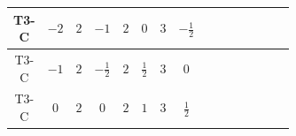 \documentclass[8pt]{article}
\begin{document}
\begin{landscape}
\begin{longtable}{@{}cccccccc >{\raggedright\arraybackslash}p{0.21\linewidth} >{\raggedright\arraybackslash}p{0.21\linewidth} >{\raggedright\arraybackslash}p{0.21\linewidth}@{}}
\midrule
T3-C & $-2$ & $2$ & $-1$ & $2$ & $0$ & $3$ & $-\frac{1}{2}$ & \scriptsize\adjustbox{max width=\linewidth}{$\begin{gathered} +D_{\mu _1}\left(S_{2,j_1}\right){}^{\dagger } D_{\mu _1}\left(S_{2,j_1}\right)\end{gathered}$} & \scriptsize\adjustbox{max width=\linewidth}{$\begin{gathered} -\overline{F_{j_1,r_1}}\, F_{j_1,r_1} M_F\end{gathered}$} & \scriptsize\adjustbox{max width=\linewidth}{$\begin{gathered} +i \overline{F_{j_1,r_1}}\, \gamma ^{\mu _1}\, D_{\mu _1}\left(F_{j_1,r_1}\right)\end{gathered}$} \\
\midrule
T3-C & $-1$ & $2$ & $-\frac{1}{2}$ & $2$ & $\frac{1}{2}$ & $3$ & $0$ & \scriptsize\adjustbox{max width=\linewidth}{$\begin{gathered} +D_{\mu _1}\left(S_{2,j_1}\right){}^{\dagger } D_{\mu _1}\left(S_{2,j_1}\right)\end{gathered}$} & \scriptsize\adjustbox{max width=\linewidth}{$\begin{gathered} -\frac{1}{2} F_{j_1,r_1}{}^T\, C\, F_{j_1,r_1} M_F\end{gathered}$} & \scriptsize\adjustbox{max width=\linewidth}{$\begin{gathered} +\frac{1}{2} i F_{j_1,r_1}{}^T\, C\, \gamma ^{\mu _1}\, D_{\mu _1}\left(F_{j_1,r_1}\right)\end{gathered}$} \\
\midrule
T3-C & $0$ & $2$ & $0$ & $2$ & $1$ & $3$ & $\frac{1}{2}$ & \scriptsize\adjustbox{max width=\linewidth}{$\begin{gathered} +D_{\mu _1}\left(S_{2,j_1}\right){}^{\dagger } D_{\mu _1}\left(S_{2,j_1}\right)\end{gathered}$} & \scriptsize\adjustbox{max width=\linewidth}{$\begin{gathered} -\overline{F_{j_1,r_1}}\, F_{j_1,r_1} M_F\end{gathered}$} & \scriptsize\adjustbox{max width=\linewidth}{$\begin{gathered} +i \overline{F_{j_1,r_1}}\, \gamma ^{\mu _1}\, D_{\mu _1}\left(F_{j_1,r_1}\right)\end{gathered}$} \\
\midrule

\end{longtable}
\end{landscape}
\end{document}

